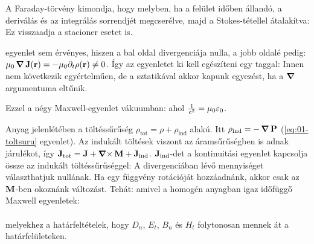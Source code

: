    A Faraday-törvény kimondja, hogy 
   melyben, ha a felület időben állandó, a deriválás és az integrálás sorrendjét megcserélve, majd a Stokes-tétellel átalakítva:
   Ez visszaadja a stacioner esetet is. 
   
    egyenlet sem érvényes, hiszen a bal oldal divergenciája nulla, a jobb oldalé pedig: $\mu_0\mathop{\boldsymbol{\nabla}}\nolimits{\mathbf{J}(\mathbf{r})}=-\mu_0\partial_t\rho(\mathbf{r})\neq 0$. Így az egyenletet ki kell egészíteni egy taggal:
   Innen nem következik egyértelműen, de a sztatikával akkor kapunk egyezést, ha a $\mathop{\boldsymbol{\nabla}}\nolimits$ argumentuma eltűnik. 
   
   Ezzel a négy Maxwell-egyenlet vákuumban:
   ahol $\frac{1}{c^2}=\mu_0\varepsilon_0$.
   
   Anyag jelenlétében a töltéssűrűség $\rho_\text{tot}=\rho+\rho_\text{ind}$ alakú. Itt $\rho_\text{ind}=-\mathop{\boldsymbol{\nabla}}\nolimits{\mathbf{P}}$ (\eqref{eq:01-toltsuru} egyenlet). Az indukált töltések viszont az áramsűrűségben is adnak járulékot, így   $\mathbf{J}_\text{tot}=\mathbf{J}+\mathop{\boldsymbol{\nabla}\times}\nolimits{\mathbf{M}}+\mathbf{J}_\text{ind}$. $\mathbf{J}_\text{ind}$-det a kontinuitási egyenlet kapcsolja össze az indukált töltéssűrűséggel: 
   A divergenciában lévő mennyiséget választhatjuk nullának. Ha egy függvény rotációját hozzáadnánk, akkor csak az $\mathbf{M}$-ben okoznánk változást. Tehát:
   amivel a homogén anyagban igaz időfüggő Maxwell egyenletek:
  \\[6pt]
  \\[10pt]
  melyekhez a határfeltételek, hogy $D_n$, $E_t$, $B_n$ és $H_t$ folytonosan mennek át a határfelületeken.
   
